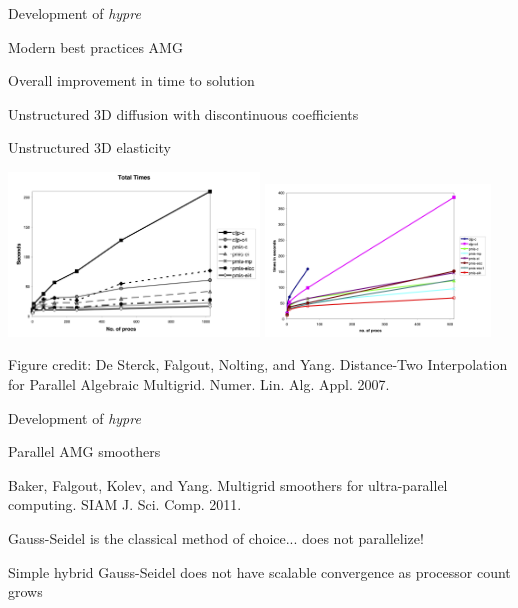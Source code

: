 \documentclass[18pt,xcolor=table]{beamer}
\begin{document}
\begin{frame}{Development of \emph{hypre}}
\begin{block}{Modern best practices AMG}
\bit
\item Overall improvement in time to solution
\bit
\item Unstructured 3D diffusion with discontinuous coefficients
\item Unstructured 3D elasticity 
\eit
\eit
\begin{center}
\includegraphics[width=0.5\textwidth]{../figures/hypreImprovements1}
\includegraphics[width=0.45\textwidth]{../figures/hypreImprovements2}
\end{center}
\end{block}
\tiny{Figure credit: De Sterck, Falgout, Nolting, and Yang. Distance-Two Interpolation for Parallel Algebraic Multigrid. Numer. Lin. Alg. Appl. 2007.}
\end{frame}

\begin{frame}{Development of \emph{hypre}}
\begin{block}{Parallel AMG smoothers}
\bit
\item Baker, Falgout, Kolev, and Yang. Multigrid smoothers for ultra-parallel computing. SIAM J. Sci. Comp. 2011.
\item Gauss-Seidel is the classical method of choice... does not parallelize!
\item Simple hybrid Gauss-Seidel does not have scalable convergence as processor count grows
\eit
\end{block}
\end{frame}
\end{document}
